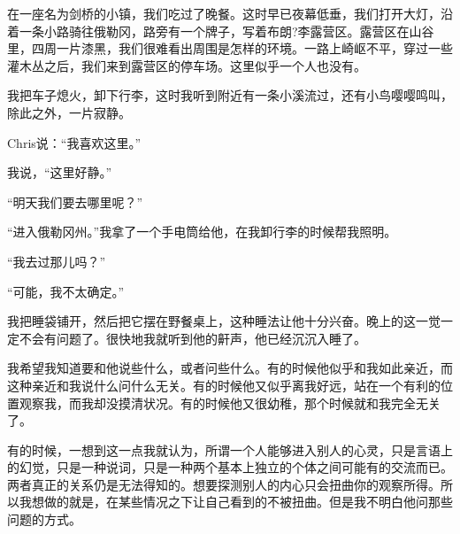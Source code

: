 \documentclass[UTF8]{article}
\begin{document}
\par 在一座名为剑桥的小镇，我们吃过了晚餐。这时早已夜幕低垂，我们打开大灯，沿着一条小路骑往俄勒冈，路旁有一个牌子，写着布朗?李露营区。露营区在山谷里，四周一片漆黑，我们很难看出周围是怎样的环境。一路上崎岖不平，穿过一些灌木丛之后，我们来到露营区的停车场。这里似乎一个人也没有。
\par 我把车子熄火，卸下行李，这时我听到附近有一条小溪流过，还有小鸟嘤嘤鸣叫，除此之外，一片寂静。
\par Chris说：“我喜欢这里。”
\par 我说，“这里好静。”
\par “明天我们要去哪里呢？”
\par “进入俄勒冈州。”我拿了一个手电筒给他，在我卸行李的时候帮我照明。
\par “我去过那儿吗？”
\par “可能，我不太确定。”
\par 我把睡袋铺开，然后把它摆在野餐桌上，这种睡法让他十分兴奋。晚上的这一觉一定不会有问题了。很快地我就听到他的鼾声，他已经沉沉入睡了。
\par 我希望我知道要和他说些什么，或者问些什么。有的时候他似乎和我如此亲近，而这种亲近和我说什么问什么无关。有的时候他又似乎离我好远，站在一个有利的位置观察我，而我却没摸清状况。有的时候他又很幼稚，那个时候就和我完全无关了。
\par 有的时候，一想到这一点我就认为，所谓一个人能够进入别人的心灵，只是言语上的幻觉，只是一种说词，只是一种两个基本上独立的个体之间可能有的交流而已。两者真正的关系仍是无法得知的。想要探测别人的内心只会扭曲你的观察所得。所以我想做的就是，在某些情况之下让自己看到的不被扭曲。但是我不明白他问那些问题的方式。
\end{document}
